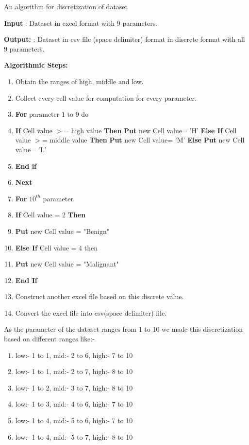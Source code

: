 \documentclass[conference]{IEEEtran}
\begin{document}
\begin{algorithm}[H]
\caption{An algorithm for discretization  of dataset}


\textbf{Input} : Dataset in excel format with $9$ parameters.

\textbf{Output:} : Dataset in csv file (space delimiter) format in discrete format with all $9$ parameters.

\textbf{Algorithmic Steps:}
\begin{enumerate}
  \item Obtain the ranges of high, middle and low.
  \item Collect every cell value for computation for every parameter.
  \item \textbf{For} parameter $1$ to $9$ do
  \item \textbf{If} Cell value $>$= high value \textbf{Then}
            \textbf{Put} new Cell value= 'H'
            \textbf{Else If} Cell value $>$= middle value \textbf{Then}
             \textbf{Put} new Cell value= 'M'
             \textbf{Else}
             \textbf{Put} new Cell value= 'L'
  \item \textbf{End if}
  \item \textbf{Next}
  \item \textbf{For} $10^{th}$ parameter
  \item \textbf{If} Cell value = 2 \textbf{Then}
  \item \textbf{Put} new Cell value = "Benign"
  \item \textbf{Else If} Cell value = 4 then
  \item \textbf{Put} new Cell value = "Malignant"
  \item \textbf{End If}
  \item Construct another excel file based on this discrete value.
  \item Convert the excel file into csv(space delimiter) file.
\end{enumerate}

\end{algorithm}



As the parameter of the dataset ranges from 1 to 10 we made this discretization based on different ranges like:-

\begin{enumerate}
\item low:- 1 to 1, mid:- 2 to 6, high:- 7 to 10
\item low:- 1 to 1, mid:- 2 to 7, high:- 8 to 10
\item low:- 1 to 2, mid:- 3 to 7, high:- 8 to 10
\item low:- 1 to 3, mid:- 4 to 6, high:- 7 to 10
\item low:- 1 to 4, mid:- 5 to 6, high:- 7 to 10
\item low:- 1 to 4, mid:- 5 to 7, high:- 8 to 10
\end{enumerate}
\end{document}
